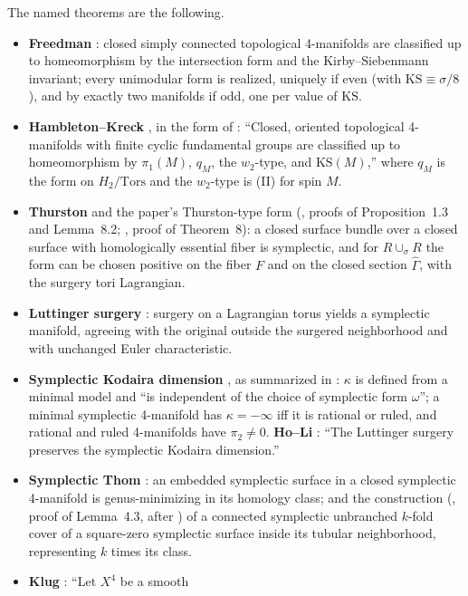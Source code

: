 \documentclass[11pt]{article}
\newcommand{\Ghat}{\widehat{\Gamma}}
\theoremstyle{definition}
\begin{document}
The named theorems are the following.
\begin{itemize}
\item \textbf{Freedman} \cite{Freedman}: closed simply connected
topological 4-manifolds are classified up to homeomorphism by the
intersection form and the Kirby--Siebenmann invariant; every unimodular
form is realized, uniquely if even (with $\mathrm{KS}\equiv
\sigma/8$), and by exactly two manifolds if odd, one per value of
$\mathrm{KS}$.
\item \textbf{Hambleton--Kreck} \cite{HK88,HK93,HKcorr}, in the form of
\cite[Theorem~5.1]{Hambleton}: ``Closed, oriented topological
4-manifolds with finite cyclic fundamental groups are classified up to
homeomorphism by $\pi_1(M)$, $q_M$, the $w_2$-type, and $\mathrm{KS}(M)$,''
where $q_M$ is the form on $H_2/\mathrm{Tors}$ and the $w_2$-type is
(II) for spin $M$.
\item \textbf{Thurston} \cite{Thurston} and the paper's Thurston-type
form (\cite{Wuebben}, proofs of Proposition~1.3 and Lemma~8.2;
\cite{LidmanPiccirillo}, proof of Theorem~8): a closed surface bundle
over a closed surface with homologically essential fiber is symplectic,
and for $R\cup_\sigma R$ the form can be chosen positive on the fiber $F$
and on the closed section $\Ghat$, with the surgery tori Lagrangian.
\item \textbf{Luttinger surgery} \cite{Luttinger,ADK}: surgery on a
Lagrangian torus yields a symplectic manifold, agreeing with the original
outside the surgered neighborhood and with unchanged Euler
characteristic.
\item \textbf{Symplectic Kodaira dimension} \cite{Li}, as summarized in
\cite[p.~1]{HoLi}: $\kappa$ is defined from a minimal model and ``is
independent of the choice of symplectic form $\omega$''; a minimal
symplectic 4-manifold has $\kappa=-\infty$ iff it is rational or ruled,
and rational and ruled 4-manifolds have $\pi_2\ne0$. \textbf{Ho--Li}
\cite[Theorem~1.1]{HoLi}: ``The Luttinger surgery preserves the
symplectic Kodaira dimension.''
\item \textbf{Symplectic Thom} \cite{OzsvathSzabo}: an embedded
symplectic surface in a closed symplectic 4-manifold is genus-minimizing
in its homology class; and the construction (\cite{Wuebben}, proof of
Lemma~4.3, after \cite{StipsiczSzabo}) of a connected symplectic
unbranched $k$-fold cover of a square-zero symplectic surface inside its
tubular neighborhood, representing $k$ times its class.
\item \textbf{Klug} \cite[Theorem~2]{Klug}: ``Let $X^4$ be a smooth

\end{itemize}
\end{document}
